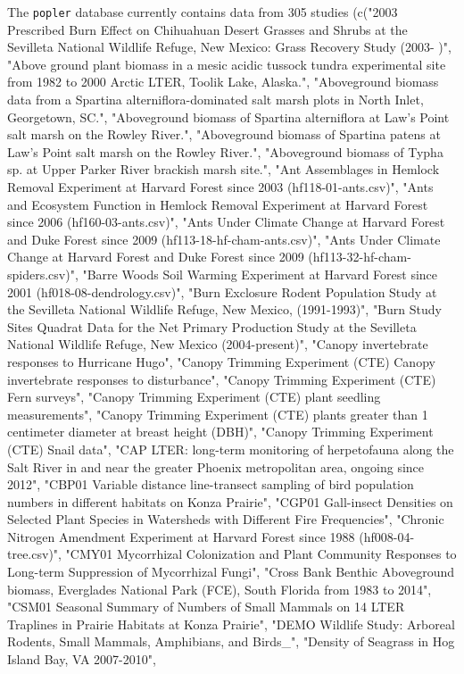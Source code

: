 \documentclass{article}\usepackage[]{graphicx}\usepackage[]{color}
\begin{document}
The \texttt{popler} database currently contains data from 305 studies (c("2003 Prescribed Burn Effect on Chihuahuan Desert Grasses and Shrubs at the Sevilleta National Wildlife Refuge, New Mexico: Grass Recovery Study (2003- )", "Above ground plant biomass in a mesic acidic tussock tundra experimental site from 1982 to 2000 Arctic LTER, Toolik Lake, Alaska.", "Aboveground biomass data from a Spartina alterniflora-dominated salt marsh plots in North Inlet, Georgetown, SC.", "Aboveground biomass of Spartina alterniflora at Law's Point salt marsh on the Rowley River.", 
"Aboveground biomass of Spartina patens at Law's Point salt marsh on the Rowley River.", "Aboveground biomass of Typha sp. at Upper Parker River brackish marsh site.", "Ant Assemblages in Hemlock Removal Experiment at Harvard Forest since 2003 (hf118-01-ants.csv)", "Ants and Ecosystem Function in Hemlock Removal Experiment at Harvard Forest since 2006 (hf160-03-ants.csv)", "Ants Under Climate Change at Harvard Forest and Duke Forest since 2009 (hf113-18-hf-cham-ants.csv)", "Ants Under Climate Change at Harvard Forest and Duke Forest since 2009 (hf113-32-hf-cham-spiders.csv)", 
"Barre Woods Soil Warming Experiment at Harvard Forest since 2001 (hf018-08-dendrology.csv)", "Burn Exclosure Rodent Population Study at the Sevilleta National Wildlife Refuge, New Mexico, (1991-1993)", "Burn Study Sites Quadrat Data for the Net Primary Production Study at the Sevilleta National Wildlife Refuge, New Mexico (2004-present)", "Canopy invertebrate responses to Hurricane Hugo", "Canopy Trimming Experiment (CTE) Canopy invertebrate responses to disturbance", "Canopy Trimming Experiment (CTE) Fern surveys", 
"Canopy Trimming Experiment (CTE) plant seedling measurements", "Canopy Trimming Experiment (CTE) plants greater than 1 centimeter diameter at breast height (DBH)", "Canopy Trimming Experiment (CTE) Snail data", "CAP LTER: long-term monitoring of herpetofauna along the Salt River in and near the greater Phoenix metropolitan area, ongoing since 2012", "CBP01 Variable distance line-transect sampling of bird population numbers in different habitats on Konza Prairie", "CGP01 Gall-insect Densities on Selected Plant Species in Watersheds with Different Fire Frequencies", 
"Chronic Nitrogen Amendment Experiment at Harvard Forest since 1988 (hf008-04-tree.csv)", "CMY01 Mycorrhizal Colonization and Plant Community Responses to Long-term Suppression of Mycorrhizal Fungi", "Cross Bank Benthic Aboveground biomass, Everglades National Park (FCE), South Florida from 1983 to 2014", "CSM01 Seasonal Summary of Numbers of Small Mammals on 14 LTER Traplines in Prairie Habitats at Konza Prairie", "DEMO Wildlife Study: Arboreal Rodents, Small Mammals, Amphibians, and Birds_", "Density of Seagrass in Hog Island Bay, VA 2007-2010", 
\end{document}
